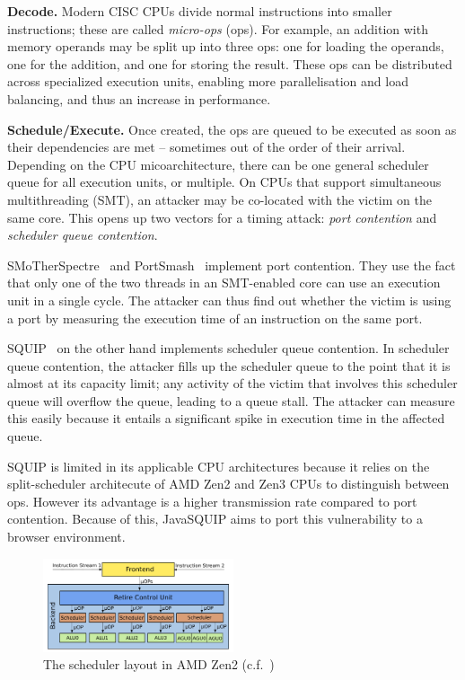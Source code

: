 \documentclass[11pt,
  titlepage=false,
]{scrreprt}
\begin{document}
\textbf{Decode.}
Modern CISC CPUs divide normal instructions into smaller instructions;
these are called \textit{micro-ops} (\textmu ops)\cite{AMD2020OptimizationEPYC7002}.
For example, an addition with memory operands may be split up into three \textmu ops: one for loading the operands, one for the addition, and one for storing the result.
These \textmu ops can be distributed across specialized execution units, enabling more parallelisation and load balancing, and thus an increase in performance.

\textbf{Schedule/Execute.}
Once created, the \textmu ops are queued to be executed as soon as their dependencies are met -- sometimes out of the order of their arrival.
Depending on the CPU micoarchitecture, there can be one general scheduler queue for all execution units, or multiple.
On CPUs that support simultaneous multithreading (SMT), an attacker may be co-located with the victim on the same core.
This opens up two vectors for a timing attack: \textit{port contention} and \textit{scheduler queue contention}.

SMoTherSpectre~\cite{Bhattacharyya2019} and PortSmash~\cite{Aldaya2019port} implement port contention.
They use the fact that only one of the two threads in an SMT-enabled core can use an execution unit in a single cycle.
The attacker can thus find out whether the victim is using a port by measuring the execution time of an instruction on the same port.

SQUIP~\cite{squip} on the other hand implements scheduler queue contention.
In scheduler queue contention, the attacker fills up the scheduler queue to the point that it is almost at its capacity limit;
any activity of the victim that involves this scheduler queue will overflow the queue, leading to a queue stall.
The attacker can measure this easily because it entails a significant spike in execution time in the affected queue.

\clearpage
SQUIP is limited in its applicable CPU architectures because it relies on the split-scheduler architecute of AMD Zen2 and Zen3 CPUs to distinguish between \textmu ops.
However its advantage is a higher transmission rate compared to port contention.
Because of this, JavaSQUIP aims to port this vulnerability to a browser environment.

\begin{figure}
    \centering
    \includegraphics[width=0.5\textwidth]{figures/Zen2 arch}

    \caption{The scheduler layout in AMD Zen2 (c.f.~\cite{AMD2017OptimizationEPYC7001})}
    \label{fig:amdzen2}
\end{figure}
\end{document}

